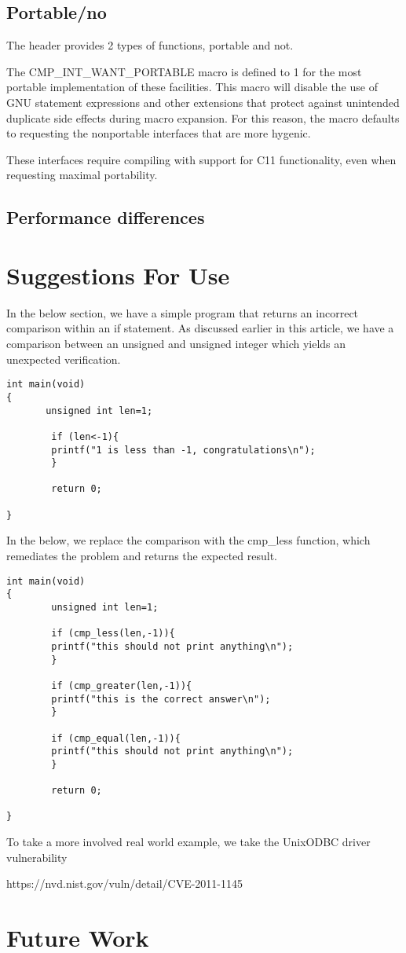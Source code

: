 \documentclass[11pt,letterpaper]{article}
\begin{document}
\subsection{Portable/no}
The header provides 2 types of functions, portable and not. 

The CMP\_INT\_WANT\_PORTABLE macro is defined to 1 for the most portable implementation of these facilities. This macro will disable the use of GNU statement expressions and other extensions that protect against unintended duplicate side effects during macro expansion. For this reason, the macro defaults to requesting the nonportable interfaces that are more hygenic.

These interfaces require compiling with support for C11 functionality, even when requesting maximal portability.

\subsection{Performance differences}

\section{Suggestions For Use}
\label{sec:suggestions}

In the below section, we have a simple program that returns an incorrect comparison within an if statement. As discussed earlier in this article, we have a comparison between an unsigned and unsigned integer which yields an unexpected verification. 

\begin{lstlisting}[style=CStyle]
int main(void)
{
       unsigned int len=1;

        if (len<-1){
        printf("1 is less than -1, congratulations\n");
        }

        return 0;
        
}
\end{lstlisting}


In the below, we replace the comparison with the cmp\_less function, which remediates the problem and returns the expected result. 

\begin{lstlisting}[style=CStyle]
int main(void)
{
        unsigned int len=1;

        if (cmp_less(len,-1)){
        printf("this should not print anything\n");
        }

        if (cmp_greater(len,-1)){
        printf("this is the correct answer\n");
        }

        if (cmp_equal(len,-1)){
        printf("this should not print anything\n");
        }

        return 0;

}
\end{lstlisting}



To take a more involved real world example, we take the UnixODBC driver vulnerability 

https://nvd.nist.gov/vuln/detail/CVE-2011-1145






\section{Future Work}
\label{sec:futurework}
\printindex
\end{document}
